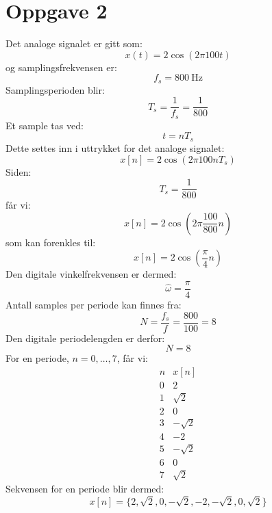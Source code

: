 

\hypertarget{oppgave2}{}
\section*{Oppgave 2}
Det analoge signalet er gitt som:
\[
x(t)=2\cos(2\pi100t)
\]
og samplingsfrekvensen er:
\[
f_s=800~\mathrm{Hz}
\]
Samplingsperioden blir:
\[
T_s
=
\frac{1}{f_s}
=
\frac{1}{800}
\]
Et sample tas ved:
\[
t=nT_s
\]
Dette settes inn i uttrykket for det analoge signalet:
\[
x[n]
=
2\cos(2\pi100nT_s)
\]
Siden:
\[
T_s=\frac{1}{800}
\]
får vi:
\[
x[n]
=
2\cos
\left(
2\pi\frac{100}{800}n
\right)
\]
som kan forenkles til:
\[
\boxed{
x[n]
=
2\cos\left(\frac{\pi}{4}n\right)
}
\]
Den digitale vinkelfrekvensen er dermed:
\[
\hat{\omega}
=
\frac{\pi}{4}
\]
Antall samples per periode kan finnes fra:
\[
N
=
\frac{f_s}{f}
=
\frac{800}{100}
=
8
\]
Den digitale periodelengden er derfor:
\[
\boxed{N=8}
\]
For en periode, $n=0,\ldots,7$, får vi:
\[
\begin{array}{c|c}
n & x[n] \\
\hline
0 & 2 \\
1 & \sqrt{2} \\
2 & 0 \\
3 & -\sqrt{2} \\
4 & -2 \\
5 & -\sqrt{2} \\
6 & 0 \\
7 & \sqrt{2}
\end{array}
\]
Sekvensen for en periode blir dermed:
\[
\boxed{
x[n]
=
\{2,\sqrt{2},0,-\sqrt{2},-2,-\sqrt{2},0,\sqrt{2}\}
}
\]